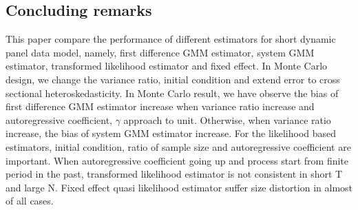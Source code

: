 \documentclass[12pt,a4paper,hyperref]{article}
\begin{document}
\subsection{Concluding remarks}
This paper compare the performance of different estimators for short dynamic panel data model, namely, first difference GMM estimator, system GMM estimator, transformed likelihood estimator and fixed effect. In Monte Carlo design, we change the variance ratio, initial condition and extend error to cross sectional heteroskedasticity.
In Monte Carlo result, we have observe the bias of first difference GMM estimator increase when variance ratio increase and autoregressive coefficient, $\gamma$ approach to unit. Otherwise, when variance ratio increase, the bias of system GMM estimator increase. For the likelihood based estimators, initial condition, ratio of sample size and  autoregressive coefficient are important.
When autoregressive coefficient going up and process start from finite period in the past, transformed likelihood estimator is not consistent in short T and large N. Fixed effect quasi likelihood estimator suffer size distortion in almost of all cases.
\newpage

\appendix
\appendixpage
\end{document}
